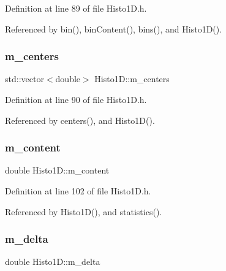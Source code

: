 Definition at line 89 of file Histo1\+D.\+h.



Referenced by bin(), bin\+Content(), bins(), and Histo1\+D().

\mbox{\label{classHisto1D_a0e03676ed176aaad2f615fa84b8ffcd3}} 
\subsubsection{\texorpdfstring{m\+\_\+centers}{m\_centers}}
{\footnotesize\ttfamily std\+::vector$<$double$>$ Histo1\+D\+::m\+\_\+centers\hspace{0.3cm}{\ttfamily [private]}}



Definition at line 90 of file Histo1\+D.\+h.



Referenced by centers(), and Histo1\+D().

\mbox{\label{classHisto1D_a75f4abeae577e232f4c012cb6b4049d7}} 
\subsubsection{\texorpdfstring{m\+\_\+content}{m\_content}}
{\footnotesize\ttfamily double Histo1\+D\+::m\+\_\+content\hspace{0.3cm}{\ttfamily [private]}}



Definition at line 102 of file Histo1\+D.\+h.



Referenced by Histo1\+D(), and statistics().

\mbox{\label{classHisto1D_a993e2e40b89e257e6f86c0742f6f06b3}} 
\subsubsection{\texorpdfstring{m\+\_\+delta}{m\_delta}}
{\footnotesize\ttfamily double Histo1\+D\+::m\+\_\+delta\hspace{0.3cm}{\ttfamily [private]}}




